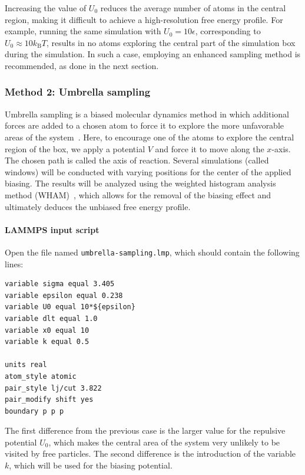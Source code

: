 \documentclass[9pt,tutorial]{livecoms}
\newcommand{\flecmd}[1]{\textcolor{command}{\texttt{#1}}} %
\begin{document}
Increasing the value of $U_0$ reduces the average number of atoms in the central
region, making it difficult to achieve a high-resolution free energy profile.
For example, running the same simulation with $U_0 = 10 \epsilon$,
corresponding to $U_0 \approx 10 k_\text{B} T$, results in no atoms exploring
the central part of the simulation box during the simulation.
In such a case, employing an enhanced sampling method is recommended, as done in the next section.

\subsubsection{Method 2: Umbrella sampling}

Umbrella sampling is a biased molecular dynamics method in which additional forces
are added to a chosen atom to force it to explore the more unfavorable areas of
the system~\cite{kastner2011umbrella, allen2017computer, frenkel2023understanding}.
Here, to encourage one of the atoms to explore the central region of the box,
we apply a potential $V$ and force it to move along the $x$-axis. The chosen path
is called the axis of reaction. Several simulations (called windows) will be
conducted with varying positions for the center of the applied biasing. The results
will be analyzed using the weighted histogram analysis method (WHAM)~\cite{kumar1992weighted},
which allows for the removal of the biasing effect and ultimately deduces the
unbiased free energy profile.

\paragraph{LAMMPS input script}

Open the file named \flecmd{umbrella-sampling.lmp}, which should
contain the following lines:
\begin{lstlisting}
variable sigma equal 3.405
variable epsilon equal 0.238
variable U0 equal 10*${epsilon}
variable dlt equal 1.0
variable x0 equal 10
variable k equal 0.5

units real
atom_style atomic
pair_style lj/cut 3.822
pair_modify shift yes
boundary p p p
\end{lstlisting}
The first difference from the previous case is the larger value
for the repulsive potential $U_0$, which makes the central area
of the system very unlikely to be visited by free particles.  The second
difference is the introduction of the variable $k$, which will be used for
the biasing potential.
\end{document}

